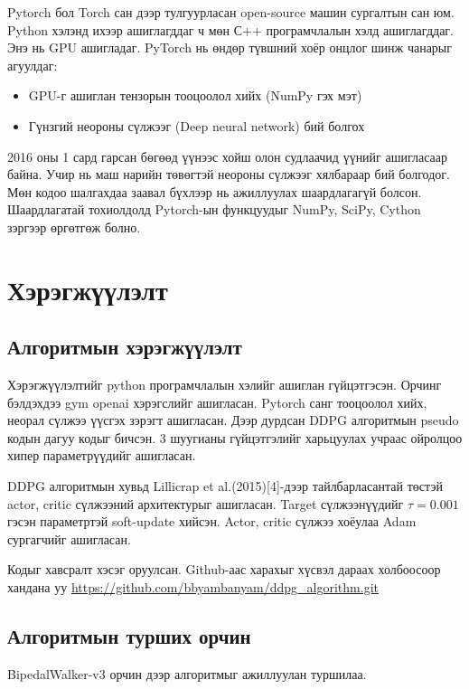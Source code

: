 \documentclass[12pt,A4]{report}
\begin{document}
Pytorch бол Torch сан дээр тулгуурласан open-source машин сургалтын сан юм. Python хэлэнд ихээр ашиглагддаг ч мөн С++ програмчлалын хэлд ашиглагддаг. Энэ нь GPU ашигладаг. PyTorch нь өндөр түвшний хоёр онцлог шинж чанарыг агуулдаг:

\begin{itemize}
	\item GPU-г ашиглан тензорын тооцоолол хийх (NumPy гэх мэт) 
	\item Гүнзгий неороны сүлжээг (Deep neural network) бий болгох
\end{itemize}

2016 оны 1 сард гарсан бөгөөд үүнээс хойш олон судлаачид үүнийг ашигласаар байна. Учир нь маш нарийн төвөгтэй неороны сүлжээг хялбараар бий болгодог. Мөн кодоо шалгахдаа заавал бүхлээр нь ажиллуулах шаардлагагүй болсон. Шаардлагатай тохиолдолд Pytorch-ын функцуудыг NumPy, SciPy, Cython зэргээр өргөтгөж болно. 
 
\chapter{Хэрэгжүүлэлт}

\section{Алгоритмын хэрэгжүүлэлт}

Хэрэгжүүлэлтийг python програмчлалын хэлийг ашиглан гүйцэтгэсэн. Орчинг бэлдэхдээ gym openai хэрэгслийг ашигласан. Pytorch санг тооцоолол хийх, неорал сүлжээ үүсгэх зэрэгт ашигласан. Дээр дурдсан DDPG алгоритмын pseudo кодын дагуу кодыг бичсэн. 3 шуугианы гүйцэтгэлийг харьцуулах учраас ойролцоо хипер параметрүүдийг ашигласан.

DDPG алгоритмын хувьд Lillicrap et al.(2015)[4]-дээр тайлбарласантай төстэй actor, critic сүлжээний архитектурыг ашигласан. Target сүлжээнүүдийг $\tau=0.001$ гэсэн параметртэй soft-update хийсэн. Actor, critic сүлжээ хоёулаа Adam сургагчийг ашигласан.

Кодыг хавсралт хэсэг оруулсан. Github-аас харахыг хүсвэл дараах холбоосоор хандана уу \url{https://github.com/bbyambanyam/ddpg_algorithm.git}

\section{Алгоритмын турших орчин}

BipedalWalker-v3 орчин дээр алгоритмыг ажиллуулан туршилаа.
\end{document}
